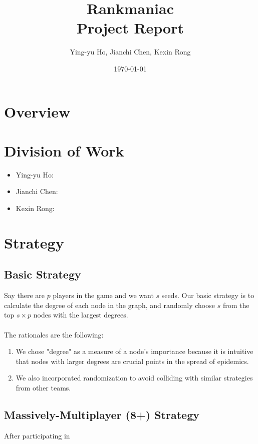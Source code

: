\documentclass[12pt]{article}
\newcommand{\course}[2]{\def\courseName{#1} \def\sectName{#2}}
\newcommand{\assn}[1]{\def\assnName{#1}}
\begin{document}
\course{Rankmaniac}{}
\assn{Project Report}
\date{\today}
\title{\courseName \sectName \\ \assnName}
\author{Ying-yu Ho, Jianchi Chen, Kexin Rong}
\maketitle

\thispagestyle{empty}

\section{Overview}


\section{Division of Work}
\begin{itemize}
\item Ying-yu Ho: 
\item Jianchi Chen: 
\item Kexin Rong: 
\end{itemize}

\section{Strategy}
\subsection{Basic Strategy}
Say there are $p$ players in the game and we want $s$ seeds. Our basic strategy is to calculate the degree of each node in the graph, and randomly choose $s$  from the top $s \times p$ nodes with the largest degrees. \\\\
The rationales are the following: 
\begin{enumerate}
\item We chose "degree" as a measure of a node's importance because it is intuitive that nodes with larger degrees are crucial points in the spread of epidemics.
\item We also incorporated randomization to avoid colliding with similar strategies from other teams. 
\end{enumerate}

\subsection{Massively-Multiplayer (8+) Strategy}
After participating in 
\end{document}
